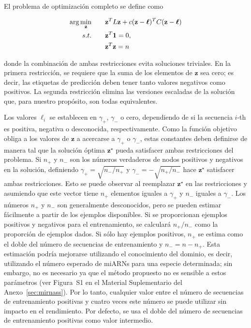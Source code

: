 El problema de optimización completo se define como

\begin{equation}
	\begin{split}
		\arg\min_{\mathbf{z}} & \qquad \mathbf{z}^TL\mathbf{z} +c(\mathbf{z}-\boldsymbol\ell)^TC(\mathbf{z}-\boldsymbol\ell) \\
		s.t. & \qquad \mathbf{z}^T\mathbf{1} = 0, \\
		     & \qquad \mathbf{z}^T\mathbf{z} = n
	\end{split}
\end{equation}

\noindent donde la combinación de ambas restricciones evita soluciones triviales. En la primera restricción, se requiere que la suma de los elementos de
$\mathbf{z}$ sea cero; es decir, las etiquetas de predicción deben tener tanto valores negativos como positivos. La segunda restricción elimina las versiones
escaladas de la solución que, para nuestro propósito, son todas equivalentes.

Los valores $\ell_{i}$ se establecen en $\gamma_{+}$, $\gamma_{-}$ o cero, dependiendo de si la secuencia $ i $-th es positiva, negativa o desconocida,
respectivamente. Como la función objetivo obliga a los valores de $\mathbf{z}$ a acercarse a $\gamma_{+}$ o $\gamma_{-}$, estas constantes deben definirse de
manera tal que la solución óptima $\mathbf{z}^\star$ pueda satisfacer ambas restricciones del problema. Si $n_{+}$ y $n_{-}$ son los números verdaderos de
nodos positivos y negativos en la solución, definiendo $\gamma_{+} = \sqrt{n_{-}/n_{+}}$ y $\gamma_{-}=-\sqrt{n_{+}/n_{-}}$ hace $\mathbf{z}^\star$ satisfacer
ambas restricciones. Esto se puede observar al reemplazar $\mathbf{z}^\star$ en las restricciones y asumiendo que este vector tiene $n_{+}$ elementos iguales a
$\gamma_{+}$ y $n_{-}$ iguales a $\gamma_{-}$. Los números $n_{+}$ y $n_{-}$ son generalmente desconocidos, pero se pueden estimar fácilmente a partir de los
ejemplos disponibles. Si se proporcionan ejemplos positivos y negativos para el entrenamiento, se calculará $n_{+}/n_{-}$ como la proporción de ejemplos
dados. Si sólo hay ejemplos positivos, $n_{+}$ se estima como el doble del número de secuencias de entrenamiento y $n_{-} = n - n_{+}$. Esta estimación
podría mejorarse utilizando el conocimiento del dominio, es decir, utilizando el número esperado de miARNs para una especie determinada; sin embargo, no es
necesario ya que el método propuesto no es sensible a estos parámetros (ver Figura~S1 en el Material Suplementario del Anexo~\ref{sec:mirnass}). Por lo tanto,
cualquier valor entre el número de secuencias de entrenamiento positivas y cuatro veces este número se puede utilizar sin impacto en el rendimiento. Por defecto,
se usa el doble del número de secuencias de entrenamiento positivas como valor intermedio.

